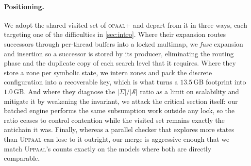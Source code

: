 \paragraph*{Positioning.}
We adopt the shared visited set of \textsc{opaal}+\ltsmin{} and depart from it in three ways,
each targeting one of the difficulties in \cref{sec:intro}. Where their expansion routes
successors through per-thread buffers into a locked multimap, we \emph{fuse} expansion and
insertion so a successor is stored by its producer, eliminating the routing phase and the
duplicate copy of each search level that it requires. Where they store a zone per symbolic
state, we intern zones and pack the discrete configuration into a recoverable key, which is
what turns a $13.5$\,GB footprint into $1.0$\,GB. And where they diagnose the
$|\Sigma|/|\mathcal{S}|$ ratio as a limit on scalability and mitigate it by weakening the
invariant, we attack the critical section itself: our batched engine performs the same
subsumption work outside any lock, so the ratio ceases to control contention while the visited
set remains exactly the antichain it was. Finally, whereas a parallel checker that explores
more states than \textsc{Uppaal} can lose to it outright, our merge is aggressive enough that
we match \textsc{Uppaal}'s counts exactly on the models where both are directly comparable.
